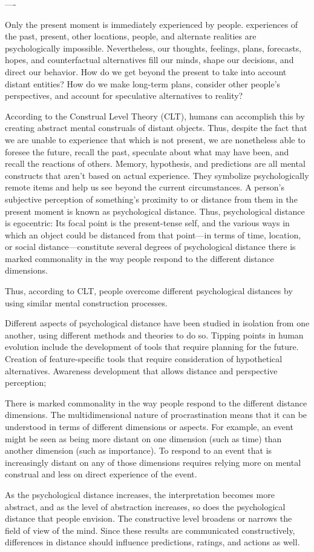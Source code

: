 




----

Only the present moment is immediately experienced by people.
experiences of the past, present, other locations, people, and alternate realities are psychologically impossible.
Nevertheless, our thoughts, feelings, plans, forecasts, hopes, and counterfactual alternatives fill our minds, shape our decisions, and direct our behavior.
How do we get beyond the present to take into account distant entities?
How do we make long-term plans, consider other people's perspectives, and account for speculative alternatives to reality?

According to the Construal Level Theory (CLT), humans can accomplish this by creating abstract mental construals of distant objects.
Thus, despite the fact that we are unable to experience that which is not present, we are nonetheless able to foresee the future, recall the past, speculate about what may have been, and recall the reactions of others.
Memory, hypothesis, and predictions are all mental constructs that aren't based on actual experience.
They symbolize psychologically remote items and help us see beyond the current circumstances.
A person's subjective perception of something's proximity to or distance from them in the present moment is known as psychological distance.
Thus, psychological distance is egocentric: Its focal point is the present-tense self, and the various ways in which an object could be distanced from that point—in terms of time, location, or social distance—constitute several degrees of psychological distance
there is marked commonality in the way people respond to the different distance dimensions.

Thus, according to CLT,  people overcome different psychological distances by using similar mental construction processes.

Different aspects of psychological distance have been studied in isolation from one another, using different methods and theories to do so.
Tipping points in human evolution include the development of tools that require planning for the future.
Creation of feature-specific tools that require consideration of hypothetical alternatives.
Awareness development that allows distance and perspective perception;

There is marked commonality in the way people respond to the different distance dimensions.
The multidimensional nature of procrastination means that it can be understood in terms of different dimensions or aspects. For example, an event might be seen as being more distant on one dimension (such as time) than another dimension (such as importance). To respond to an event that is increasingly distant on any of those dimensions requires relying more on mental construal and less on direct experience of the event.


As the psychological distance increases, the interpretation becomes more abstract, and as the level of abstraction
increases, so does the psychological distance that people envision. The constructive level broadens or narrows the field of view of the mind. Since these results are communicated constructively, differences in distance should influence predictions, ratings, and actions as well. \cite{Trope2010Apr}
